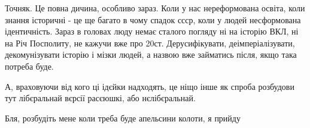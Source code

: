 \begin{itemize}
Точняк. Це повна дичина, особливо зараз. Коли у нас нереформована освіта, коли
знання історичні - це ще багато в чому спадок ссср, коли у людей несформована
ідентичність. Зараз в головах люду немає сталого погляду ні на історію ВКЛ, ні
на Річ Посполиту, не кажучи вже про 20ст. Дерусифікувати, деімперіалізувати,
декомунізувати історію і мізки людей, а назвою вже займатись після, якщо така
потреба буде.

А, враховуючи від кого ці ідєйки надходять, це ніщо інше як спроба розбудови
тут лібєральнай вєрсії расєюшкі, або нєлібєральнай.


Бля, розбудіть мене коли треба буде апельсини колоти, я прийду

\end{itemize}

